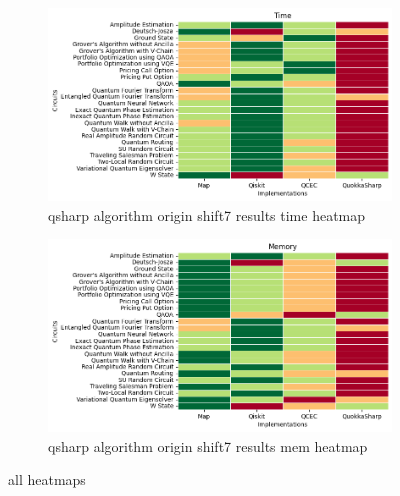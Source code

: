 
    \begin{figure}
    \centering
    \begin{subfigure}{.5\textwidth}
      \centering
      \includegraphics[width=1\linewidth]{benchmarks/./qsharp/all/algorithm/qsharp_algorithm_origin_shift7_results_time_heatmap.png}
      \caption{qsharp algorithm origin shift7 results time heatmap}
      \label{fig:gensets_qsharp_algorithm_origin_shift7_results_time_heatmap}
    \end{subfigure}
    \begin{subfigure}{.5\textwidth}
      \centering
      \includegraphics[width=1\linewidth]{benchmarks/./qsharp/all/algorithm/qsharp_algorithm_origin_shift7_results_mem_heatmap.png}
      \caption{qsharp algorithm origin shift7 results mem heatmap}
      \label{fig:gensets_qsharp_algorithm_origin_shift7_results_mem_heatmap}
    \end{subfigure}
    \caption{all heatmaps}
    \label{fig:gensets_qsharp_algorithm_origin_shift7_results_heatmaps}
    \end{figure}
    